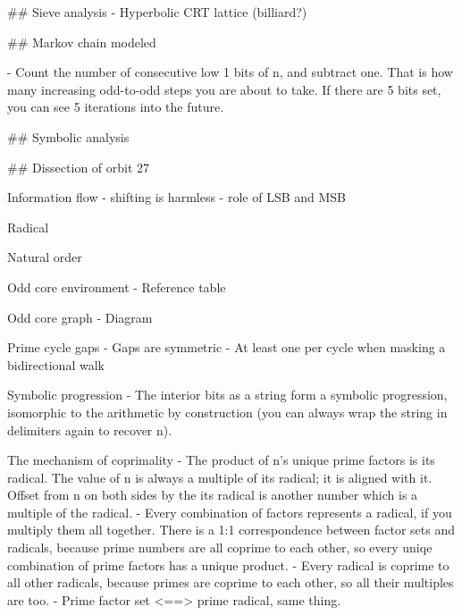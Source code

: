\documentclass[12pt]{article}
\theoremstyle{plain}
\theoremstyle{definition}
\begin{document}
## Sieve analysis
- Hyperbolic CRT lattice (billiard?)

## Markov chain modeled





- Count the number of consecutive low 1 bits of n, and subtract one. That is how many increasing odd-to-odd steps you are about to take. If there are 5 bits set, you can see 5 iterations into the future. 



## Symbolic analysis



## Dissection of orbit 27









Information flow
- shifting is harmless
- role of LSB and MSB


Radical 

Natural order







Odd core environment
- Reference table

Odd core graph
- Diagram


Prime cycle gaps
- Gaps are symmetric
- At least one per cycle when masking a bidirectional walk




\newpage






Symbolic progression
- The interior bits as a string form a symbolic progression, isomorphic to the arithmetic by construction (you can always wrap the string in delimiters again to recover n).



The mechanism of coprimality
- The product of n's unique prime factors is its radical. The value of n is always a multiple of its radical; it is aligned with it. Offset from n on both sides by the its radical is another number which is a multiple of the radical.
- Every combination of factors represents a radical, if you multiply them all together. There is a 1:1 correspondence between factor sets and radicals, because prime numbers are all coprime to each other, so every uniqe combination of prime factors has a unique product.
- Every radical is coprime to all other radicals, because primes are coprime to each other, so all their multiples are too.
- Prime factor set <==> prime radical, same thing.
\end{document}
